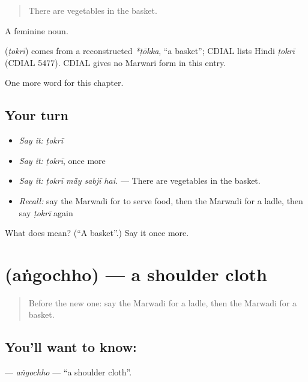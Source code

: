 \begin{quote}
There are vegetables in the basket.
\end{quote}

A feminine noun.

\begin{cousinweb}
\textbf{} (\emph{ṭokrī}) comes from a reconstructed \emph{*ṭōkka}, \textquotedblleft{}a basket\textquotedblright{}; CDIAL lists Hindi \emph{ṭokrī} (CDIAL 5477). CDIAL gives no Marwari form in this entry.
\end{cousinweb}

\begin{grammarlens}[title={What you've built}]
One more word for this chapter.
\end{grammarlens}

\subsection*{Your turn}
\begin{itemize}
\raggedright
  \item \emph{Say it:} \emph{ṭokrī}
  \item \emph{Say it:} \emph{ṭokrī}, once more
  \item \emph{Say it:} \emph{ṭokrī mā̃y sabjī hai.} — There are vegetables in the basket.
  \item \emph{Recall:} say the Marwadi for to serve food, then the Marwadi for a ladle, then say \emph{ṭokrī} again
\end{itemize}

\begin{tcolorbox}[breakable,colback=teal!4,colframe=teal!35!black,title={Before you move on}]
What does  mean? (\textquotedblleft{}A basket\textquotedblright{}.) Say it once more.
\end{tcolorbox}
\section[\texorpdfstring{\mw{अंगोछो} (aṅgochho)}{अंगोछो (aṅgochho)}]{ (aṅgochho) — a shoulder cloth}

\label{lesson:MW-C183-angochho}



\begin{quote}
Before the new one: say the Marwadi for a ladle, then the Marwadi for a basket.
\end{quote}

\subsection*{You'll want to know: }
\textbf{} — \emph{aṅgochho} — \textquotedblleft{}a shoulder cloth\textquotedblright{}.

